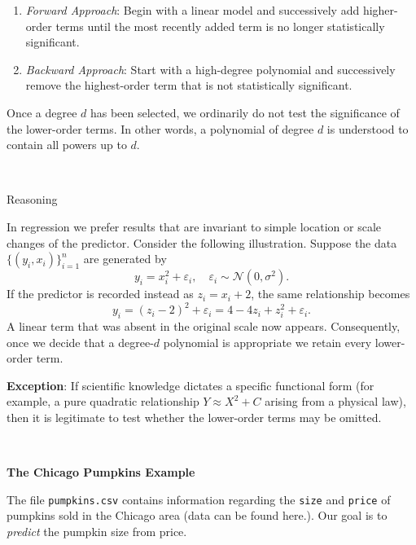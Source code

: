 \documentclass[
]{book}
\newenvironment{Shaded}{\begin{snugshade}}{\end{snugshade}}
\newcommand{\AttributeTok}[1]{\textcolor[rgb]{0.13,0.29,0.53}{#1}}
\newcommand{\ConstantTok}[1]{\textcolor[rgb]{0.56,0.35,0.01}{#1}}
\newcommand{\DecValTok}[1]{\textcolor[rgb]{0.00,0.00,0.81}{#1}}
\newcommand{\FunctionTok}[1]{\textcolor[rgb]{0.13,0.29,0.53}{\textbf{#1}}}
\newcommand{\NormalTok}[1]{#1}
\newcommand{\OtherTok}[1]{\textcolor[rgb]{0.56,0.35,0.01}{#1}}
\newcommand{\SpecialCharTok}[1]{\textcolor[rgb]{0.81,0.36,0.00}{\textbf{#1}}}
\newcommand{\StringTok}[1]{\textcolor[rgb]{0.31,0.60,0.02}{#1}}
\begin{document}
\begin{enumerate}
\def\labelenumi{\arabic{enumi}.}
\item
  \emph{Forward Approach}: Begin with a linear model and successively add higher-order terms until the most recently added term is no longer statistically significant.
\item
  \emph{Backward Approach}: Start with a high-degree polynomial and successively remove the highest-order term that is not statistically significant.
\end{enumerate}

Once a degree \(d\) has been selected, we ordinarily do not test the significance of the lower-order terms. In other words, a polynomial of degree \(d\) is understood to contain all powers up to \(d\).

~

Reasoning

In regression we prefer results that are invariant to simple location or scale changes of the predictor. Consider the following illustration. Suppose the data \(\{(y_i, x_i)\}_{i=1}^n\) are generated by
\[
y_i = x_i^2 + \varepsilon_i, \quad \varepsilon_i \sim \mathcal{N}(0, \sigma^2).
\]
If the predictor is recorded instead as \(z_i = x_i + 2\), the same relationship becomes
\[
y_i = (z_i - 2)^2 + \varepsilon_i = 4 - 4z_i + z_i^2 + \varepsilon_i.
\]
A linear term that was absent in the original scale now appears. Consequently, once we decide that a degree-\(d\) polynomial is appropriate we retain every lower-order term.

\textbf{Exception}: If scientific knowledge dictates a specific functional form (for example, a pure quadratic relationship \(Y\approx X^2+C\) arising from a physical law), then it is legitimate to test whether the lower-order terms may be omitted.

~

\textbf{The Chicago Pumpkins Example}

The file \texttt{pumpkins.csv} contains information regarding the \texttt{size} and \texttt{price} of pumpkins sold in the Chicago area (data can be found here.). Our goal is to \emph{predict} the pumpkin size from price.

\begin{Shaded}
\end{Shaded}
\end{document}
